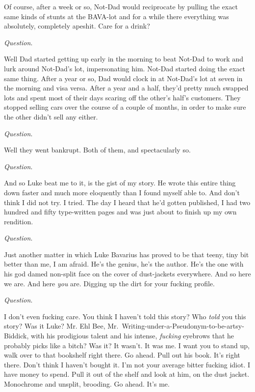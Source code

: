 Of course, after a week or so, Not-Dad would reciprocate by pulling
the exact same kinds of stunts at the BAVA-lot and for a while
there everything was absolutely, completely apeshit. Care for a
drink?



{\em Question}.



Well Dad started getting up early in the morning to beat Not-Dad to
work and lurk around Not-Dad's lot, impersonating him.
Not-Dad started doing the exact same thing. After a year or so, Dad
would clock in at Not-Dad's lot at seven in the morning and
visa versa. After a year and a half, they'd pretty much
swapped lots and spent most of their days scaring off the other's
half's customers. They stopped selling cars over the course of a
couple of months, in order to make sure the other didn't sell any
either.



{\em Question}.



Well they went bankrupt. Both of them, and spectacularly so.



{\em Question}.



And so Luke beat me to it, is the gist of my story. He wrote this
entire thing down faster and much more eloquently than I found
myself able to. And don't think I did not try. I tried. The
day I heard that he'd gotten published, I had two hundred and
fifty type-written pages and was just about to finish up my own
rendition.



{\em Question}.



Just another matter in which Luke Bavarius has proved to be that
teeny, tiny bit better than me, I am afraid. He's the genius,
he's the author. He's the one with his god damed
non-split face on the cover of dust-jackets everywhere. And so here
we are. And here {\em you} are. Digging up the dirt for your
fucking profile.



{\em Question}.



I don't even fucking care. You think I haven't told
this story? Who {\em told} you this story? Was it Luke? Mr. Ehl
Bee, Mr.\ Writing-under-a-Pseudonym-to-be-artsy-Biddick, with his
prodigious talent and his intense, {\em fucking} eyebrows that he
probably picks like a bitch? Was it? It wasn't. It was me. I
want you to stand up, walk over to that bookshelf right there. Go
ahead. Pull out his book. It's right there. Don't think
I haven't bought it. I'm not your average bitter fucking
idiot. I have money to spend. Pull it out of the shelf and look at
him, on the dust jacket. Monochrome and unsplit, brooding. Go
ahead. It's me.

